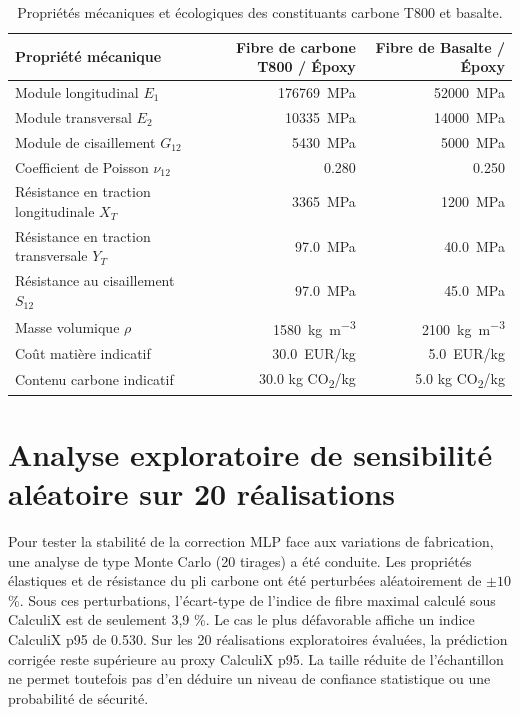 \documentclass[10pt,twocolumn]{article}
\begin{document}
\begin{table}[h]
\centering
\caption{Propriétés mécaniques et écologiques des constituants carbone T800 et basalte.}
\label{tab:material-properties}
\small
\begin{tabular}{lrr}
\toprule
\textbf{Propriété mécanique} & \textbf{Fibre de carbone T800 / Époxy} & \textbf{Fibre de Basalte / Époxy} \\
\midrule
Module longitudinal $E_1$ & \SI{176769}{MPa} & \SI{52000}{MPa} \\
Module transversal $E_2$ & \SI{10335}{MPa} & \SI{14000}{MPa} \\
Module de cisaillement $G_{12}$ & \SI{5430}{MPa} & \SI{5000}{MPa} \\
Coefficient de Poisson $\nu_{12}$ & \num{0.280} & \num{0.250} \\
Résistance en traction longitudinale $X_T$ & \SI{3365}{MPa} & \SI{1200}{MPa} \\
Résistance en traction transversale $Y_T$ & \SI{97.0}{MPa} & \SI{40.0}{MPa} \\
Résistance au cisaillement $S_{12}$ & \SI{97.0}{MPa} & \SI{45.0}{MPa} \\
Masse volumique $\rho$ & \SI{1580}{kg.m^{-3}} & \SI{2100}{kg.m^{-3}} \\
Coût matière indicatif & \SI{30.0}{EUR/kg} & \SI{5.0}{EUR/kg} \\
Contenu carbone indicatif & \num{30.0} kg CO\textsubscript{2}/kg & \num{5.0} kg CO\textsubscript{2}/kg \\
\bottomrule
\end{tabular}
\end{table}

\section{Analyse exploratoire de sensibilité aléatoire sur 20 réalisations}

Pour tester la stabilité de la correction MLP face aux variations de fabrication, une analyse de type Monte Carlo (20 tirages) a été conduite. Les propriétés élastiques et de résistance du pli carbone ont été perturbées aléatoirement de $\pm 10$ \%. Sous ces perturbations, l'écart-type de l'indice de fibre maximal calculé sous CalculiX est de seulement 3,9 \%. Le cas le plus défavorable affiche un indice CalculiX p95 de \num{0.530}. Sur les 20 réalisations exploratoires évaluées, la prédiction corrigée reste supérieure au proxy CalculiX p95. La taille réduite de l'échantillon ne permet toutefois pas d'en déduire un niveau de confiance statistique ou une probabilité de sécurité.
\end{document}
